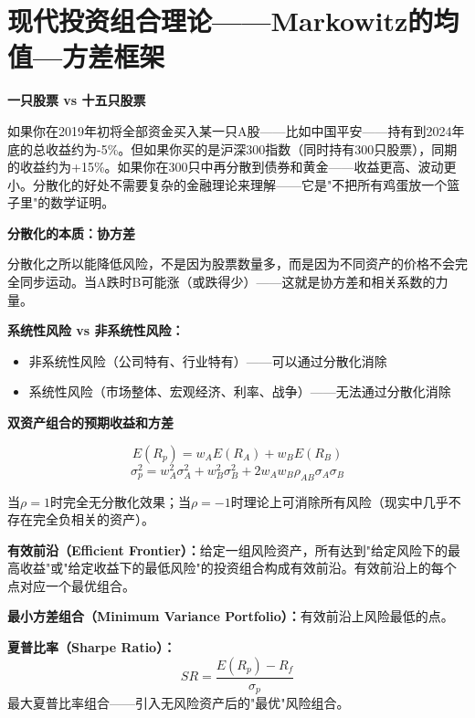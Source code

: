 \documentclass[a4paper,11pt]{ctexbook}
\begin{document}
{\newpage
\chapter{现代投资组合理论——Markowitz的均值—方差框架}

\begin{scenario}
\textbf{一只股票 vs 十五只股票}

如果你在2019年初将全部资金买入某一只A股——比如中国平安——持有到2024年底的总收益约为-5\%。但如果你买的是沪深300指数（同时持有300只股票），同期的收益约为+15\%。如果你在300只中再分散到债券和黄金——收益更高、波动更小。分散化的好处不需要复杂的金融理论来理解——它是"不把所有鸡蛋放一个篮子里"的数学证明。
\end{scenario}

\begin{qualitative}
\textbf{分散化的本质：协方差}

分散化之所以能降低风险，不是因为股票数量多，而是因为不同资产的价格不会完全同步运动。当A跌时B可能涨（或跌得少）——这就是协方差和相关系数的力量。

\textbf{系统性风险 vs 非系统性风险：}
\begin{itemize}
  \item 非系统性风险（公司特有、行业特有）——可以通过分散化消除
  \item 系统性风险（市场整体、宏观经济、利率、战争）——无法通过分散化消除
\end{itemize}
\end{qualitative}

\begin{quantitative}
\textbf{双资产组合的预期收益和方差}

\[
E(R_p) = w_A E(R_A) + w_B E(R_B)
\]
\[
\sigma_p^2 = w_A^2 \sigma_A^2 + w_B^2 \sigma_B^2 + 2 w_A w_B \rho_{AB} \sigma_A \sigma_B
\]

当$\rho=1$时完全无分散化效果；当$\rho=-1$时理论上可消除所有风险（现实中几乎不存在完全负相关的资产）。

\textbf{有效前沿（Efficient Frontier）：}给定一组风险资产，所有达到"给定风险下的最高收益"或"给定收益下的最低风险"的投资组合构成有效前沿。有效前沿上的每个点对应一个最优组合。

\textbf{最小方差组合（Minimum Variance Portfolio）：}有效前沿上风险最低的点。

\textbf{夏普比率（Sharpe Ratio）：}
\[
SR = \frac{E(R_p) - R_f}{\sigma_p}
\]
最大夏普比率组合——引入无风险资产后的"最优"风险组合。
\end{quantitative}

}
\end{document}
